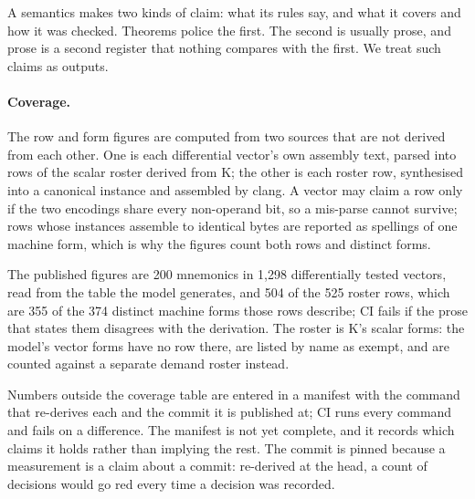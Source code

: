 \documentclass[runningheads]{llncs}
\newcommand{\src}[1]{}  %
\begin{document}
A semantics makes two kinds of claim: what its rules say, and what it covers and how it was checked.
Theorems police the first. The second is usually prose, and prose is a second register that nothing
compares with the first. We treat such claims as outputs.

\paragraph{Coverage.}
The row and form figures are computed from two sources that are not derived from each other. One is each
differential vector's own assembly text, parsed into rows of the scalar roster derived from K; the
other is each roster row, synthesised into a canonical instance and assembled by clang. A vector may
claim a row only if the two encodings share every non-operand bit, so a mis-parse cannot survive; rows whose
instances assemble to identical bytes are reported as spellings of one machine form, which is why the
figures count both rows and distinct forms.
\src{scripts/claimed\_forms.py module docstring}
The published figures are 200 mnemonics in 1{,}298 differentially tested vectors, read from the table
the model generates, and 504 of the 525 roster rows, which are 355 of the 374 distinct machine forms those
rows describe; CI fails if the prose that states them disagrees with the derivation. The roster is K's
scalar forms: the model's vector forms have no row there, are listed by name as exempt, and are counted
against a separate demand roster instead.
\src{scripts/claimed\_forms.py, the mnemonic count read from the generated COVERAGE.md, and CLAIMS\_NO\_ROW (358 SIMD entries of 421);
111 of the 200 mnemonics take an xmm operand (README.md:64, at the pinned sha); docs/COVERAGE.md:5 and README.md:61-62, checked against the derivation by scripts/claimed\_forms.py --check in CI;
this paper's copy is checked against docs/CLAIMS.tsv[coverage\_mnemonics, coverage\_forms, coverage\_rows\_covered,
coverage\_rows\_total, coverage\_forms\_covered, coverage\_forms\_distinct], which read COVERAGE.md at the pin (D231)}
Numbers outside the coverage table are entered in a manifest with the command that re-derives each
and the commit it is published at; CI runs every command and fails on a difference. The manifest is
not yet complete, and it records which claims it holds rather than implying the rest. The commit is pinned
because a measurement is a claim about a commit: re-derived at the head, a count of decisions would go
red every time a decision was recorded.
\src{docs/CLAIMS.tsv header; scripts/check\_claims.py}
\end{document}
